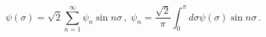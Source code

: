 \begin{equation}
\psi (\sigma )=\sqrt{2}\sum_{n=1}^{\infty }\psi _{n}\sin n\sigma \,,\;\psi
_{n}={\frac{\sqrt{2}}{\pi }}\int_{0}^{\pi }d\sigma \psi (\sigma )\sin
n\sigma \,.  \label{eq_psi_exp}
\end{equation}

